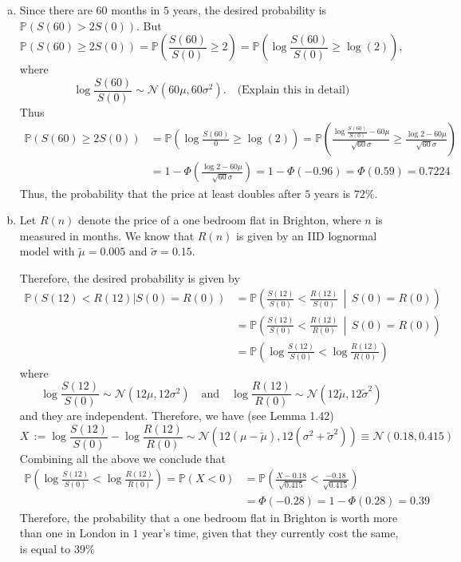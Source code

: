 \documentclass[11pt,a4paper]{report}
\begin{document}
\begin{enumerate}[(a)]
    \item Since there are 60 months in $5$ years, the desired probability is $\mathbb{P}(S(60) > 2S(0))$. But $$\mathbb{P}(S(60) \geq 2S(0))= \mathbb{P}\left(\frac{S(60)}{S(0)}\geq 2\right)=\mathbb{P}\left(\log \frac{S(60)}{S(0)}\geq \log(2)\right),$$ where $$\log \frac{S(60)}{S(0)}\sim \mathcal{N}(60\mu, 60\sigma^2).\quad \text{(Explain this in detail)}$$ Thus
    \begin{align*}
        \mathbb{P}(S(60) \geq 2S(0)) &= \mathbb{P}\left(\log\frac{S(60)}{0}\geq \log(2)\right)=\mathbb{P}\left(\frac{\log \frac{S(60)}{S(0)}-60\mu}{\sqrt{60}\sigma}\geq \frac{\log 2-60\mu}{\sqrt{60}\sigma}\right)\\
        &= 1-\Phi\left(\frac{\log 2-60\mu}{\sqrt{60}\sigma}\right) = 1 - \Phi(-0.96)=\Phi(0.59)=0.7224
    \end{align*}
    Thus, the probability that the price at least doubles after $5$ years is $72\%$.
    \item Let $R(n)$ denote the price of a one bedroom flat in Brighton, where $n$ is measured in months. We know that $R(n)$ is given by an IID lognormal model with $\tilde{\mu} = 0.005$ and $\tilde{\sigma} = 0.15$.\par
    Therefore, the desired probability is given by
    \begin{align*}
        \mathbb{P}(S(12) < R(12)| S(0) = R(0)) &= \mathbb{P}\left(\frac{S(12)}{S(0)}<\frac{R(12)}{S(0)}\,\middle|\, S(0)=R(0)\right)\\
        &= \mathbb{P}\left(\frac{S(12)}{S(0)}<\frac{R(12)}{R(0)}\,\middle|\, S(0)=R(0)\right)\\
        &= \mathbb{P}\left(\log \frac{S(12)}{S(0)}<\log \frac{R(12)}{R(0)}\right)
    \end{align*}
    where $$\log \frac{S(12)}{S(0)}\sim \mathcal{N}(12\mu,12\sigma^2)\quad \text{and}\quad \log \frac{R(12)}{R(0)}\sim\mathcal{N}(12\tilde{\mu},12\tilde{\sigma}^2)$$ and they are independent. Therefore, we have (see Lemma 1.42) $$X\,:=\log \frac{S(12)}{S(0)}-\log \frac{R(12)}{R(0)}\sim\mathcal{N}(12(\mu-\tilde{\mu}),12(\sigma^2+\tilde{\sigma}^2))\equiv \mathcal{N}(0.18,0.415)$$ Combining all the above we conclude that
    \begin{align*}
        \mathbb{P}\left(\log \frac{S(12)}{S(0)}<\log \frac{R(12)}{R(0)}\right)=\mathbb{P}(X<0) &= \mathbb{P}\left(\frac{X-0.18}{\sqrt{0.415}}<\frac{-0.18}{\sqrt{0.415}}\right)\\
        &= \Phi(-0.28)=1-\Phi(0.28)=0.39
    \end{align*}
    Therefore, the probability that a one bedroom flat in Brighton is worth more than one in London in $1$ year’s time, given that they currently cost the same, is equal to $39\%$

\end{enumerate}
\end{document}
